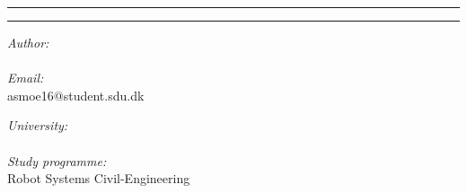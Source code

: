 \documentclass[../main.tex]{subfiles}
\begin{document}
\vspace{3cm}
\hrule
\begin{center}
	{\bf\Huge\Title}
\end{center}
\hrule
\begin{multicols}{2}
	\begin{flushleft}
		\textit{Author:} \\
		\Author\\
		\vspace{10pt}
		\textit{Email:} \\
		asmoe16@student.sdu.dk

	\end{flushleft}
	\columnbreak
	\begin{flushright}
		\textit{University:}\\
		\University\\
		\vspace{10pt}
		\textit{Study programme:} \\
		Robot Systems Civil-Engineering
	\end{flushright}
\end{multicols}
\end{document}
